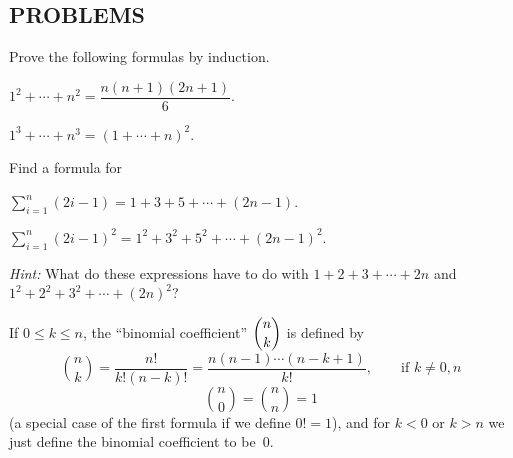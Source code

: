 \subsection*{PROBLEMS}

 Prove the following formulas by induction.
\begin{romans}
\item $1^2 + \cdots + n^2 = \dfrac{n(n+1)(2n+1)}{6}$.
\item $1^3 + \cdots + n^3 = (1 + \cdots + n)^2$.
\end{romans}

 Find a formula for
\begin{romans}
\item $\displaystyle\sum_{i=1}^{n} (2i - 1) = 1 + 3 + 5 + \cdots + (2n - 1)$.
\item $\displaystyle\sum_{i=1}^{n} (2i - 1)^2 = 1^2 + 3^2 + 5^2 + \cdots + (2n - 1)^2$.
\end{romans}
\textit{Hint:} What do these expressions have to do with
$1 + 2 + 3 + \cdots + 2n$ and $1^2 + 2^2 + 3^2 + \cdots + (2n)^2$?

 If $0 \leq k \leq n$, the ``binomial coefficient'' $\dbinom{n}{k}$ is
defined by
\[
\binom{n}{k} = \frac{n!}{k!(n-k)!}
= \frac{n(n-1)\cdots(n-k+1)}{k!},
\qquad \text{if } k \neq 0, n
\]
\[
\binom{n}{0} = \binom{n}{n} = 1
\]
(a special case of the first formula if we define $0! = 1$),
and for $k < 0$ or $k > n$ we just define the binomial coefficient to be~$0$.


